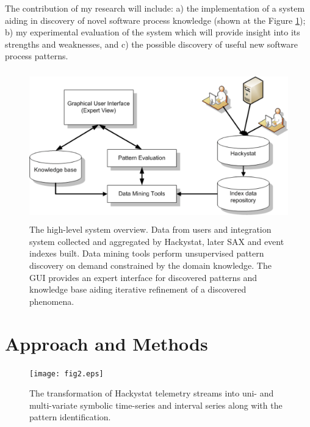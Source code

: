 \documentclass[11pt,oneside]{article}
\begin{document}
The contribution of my research will include: a) the implementation of a system aiding in discovery of novel software process knowledge (shown at the Figure \ref{fig:system_overview}); b) my experimental evaluation of the system which will provide insight into its strengths and weaknesses, and c) the possible discovery of useful new software process patterns.
\begin{figure}[tbp]
   \centering
   \includegraphics[height=65mm]{system_overview.eps}
   \caption{The high-level system overview. Data from users and integration system collected and aggregated by Hackystat, later SAX and event indexes built. Data mining tools perform unsupervised pattern discovery on demand constrained by the domain knowledge. The GUI provides an expert interface for discovered patterns and knowledge base aiding iterative refinement of a discovered phenomena.}
   \label{fig:system_overview}
\end{figure}

\section{Approach and Methods}
\begin{figure}[tbp]
   \centering
   \texttt{[image: fig2.eps]}
   \caption{The transformation of Hackystat telemetry streams into uni- and multi-variate symbolic time-series and interval series along with the pattern identification.}
   \label{fig:fig2}
\end{figure}
\end{document}
